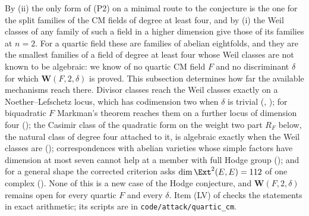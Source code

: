 By (ii) the only form of (P2) on a minimal route to the
conjecture is the one for the split families of the CM fields of degree at
least four, and by (i) the Weil classes of any family of
such a field in a higher dimension give those of its families at $n=2$. For a
quartic field these are families of abelian eightfolds, and they are the
smallest families of a field of degree at least four whose Weil classes are
not known to be algebraic: we know of no quartic CM field $F$ and no
discriminant $\delta$ for which $\mathbf{W}(F,2,\delta)$ is proved. This
subsection determines how far the available mechanisms reach there. Divisor
classes reach the Weil classes exactly on a Noether--Lefschetz locus, which
has codimension two when $\delta$ is trivial (,
); for biquadratic $F$ Markman's theorem reaches them on
a further locus of dimension four (); the Casimir
class of the quadratic form on the weight two part $R_{F}$ below, the natural
class of degree four attached to it, is algebraic exactly when the Weil
classes are (); correspondences with abelian
varieties whose simple factors have dimension at most seven cannot help at a
member with full Hodge group (); and for a general
shape the corrected criterion asks $\dim\Ext^{2}(E,E)=112$ of one complex
(). None of this is a new case of the Hodge
conjecture, and $\mathbf{W}(F,2,\delta)$ remains open for every quartic $F$
and every $\delta$. Item (LV) of  checks the
statements in exact arithmetic; its scripts are in
\texttt{code/attack/quartic\_cm}.


